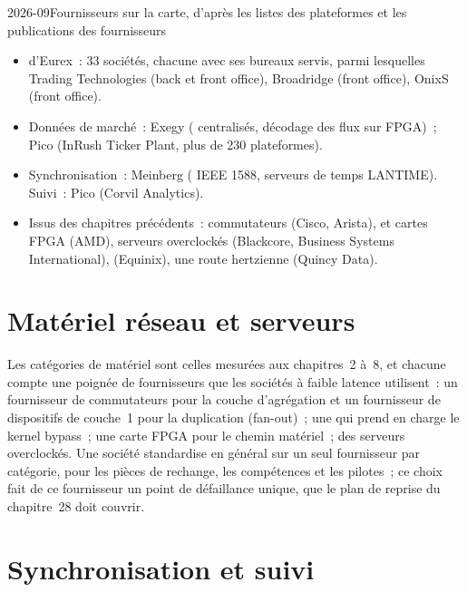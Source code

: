 \begin{dated}{2026-09}{Fournisseurs sur la carte, d'après les listes des plateformes et les publications des fournisseurs}\label{dat:nw:the-vendor-map:lists}
\begin{itemize}
\item {} d'Eurex~: 33 sociétés, chacune avec ses bureaux servis, parmi lesquelles Trading Technologies (back
  et front office), Broadridge (front office), OnixS (front office).
\item Données de marché~: Exegy ( centralisés, décodage des flux sur FPGA)~; Pico (InRush Ticker Plant, plus de 230 plateformes).
\item Synchronisation~: Meinberg ( IEEE 1588, serveurs de temps LANTIME). Suivi~: Pico (Corvil Analytics).
\item Issus des chapitres précédents~: commutateurs (Cisco, Arista),  et cartes FPGA (AMD), serveurs overclockés (Blackcore,
  Business Systems International),  (Equinix), une route hertzienne (Quincy Data).
\end{itemize}
\end{dated}

\section{Matériel réseau et serveurs}

Les catégories de matériel sont celles mesurées aux chapitres~2 à~8, et chacune compte une poignée de fournisseurs que les sociétés à faible latence utilisent~: un
fournisseur de commutateurs pour la couche d'agrégation et un fournisseur de dispositifs de couche~1 pour la duplication (fan-out)~; une  qui prend en charge le kernel bypass~; une
carte FPGA pour le chemin matériel~; des serveurs overclockés. Une société standardise en général sur un seul fournisseur par catégorie, pour les pièces de rechange, les
compétences et les pilotes~; ce choix fait de ce fournisseur un point de défaillance unique, que le plan de reprise du chapitre~28 doit couvrir.

\section{Synchronisation et suivi}

